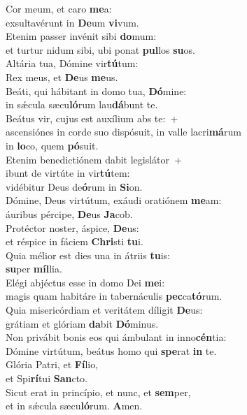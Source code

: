 \evenverse Cor meum, et caro \textbf{me}a:~\*\\
\evenverse exsultavérunt in \textbf{De}um \textbf{vi}vum.\\
\oddverse Etenim passer invénit sibi \textbf{do}mum:~\*\\
\oddverse et turtur nidum sibi, ubi ponat \textbf{pul}los \textbf{su}os.\\
\evenverse Altária tua, Dómine vir\textbf{tú}tum:~\*\\
\evenverse Rex meus, et \textbf{De}us \textbf{me}us.\\
\oddverse Beáti, qui hábitant in domo tua, \textbf{Dó}mine:~\*\\
\oddverse in sǽcula sæcu\textbf{ló}rum lau\textbf{dá}bunt te.\\
\evenverse Beátus vir, cujus est auxílium abs te:~+\\
\evenverse  ascensiónes in corde suo dispósuit, in valle lacri\textbf{má}rum~\*\\
\evenverse in \textbf{lo}co, quem \textbf{pó}suit.\\
\oddverse Etenim benedictiónem dabit legislátor~+\\
\oddverse  ibunt de virtúte in vir\textbf{tú}tem:~\*\\
\oddverse vidébitur Deus de\textbf{ó}rum in \textbf{Si}on.\\
\evenverse Dómine, Deus virtútum, exáudi oratiónem \textbf{me}am:~\*\\
\evenverse áuribus pércipe, \textbf{De}us \textbf{Ja}cob.\\
\oddverse Protéctor noster, áspice, \textbf{De}us:~\*\\
\oddverse et réspice in fáciem \textbf{Chri}sti \textbf{tu}i.\\
\evenverse Quia mélior est dies una in átriis \textbf{tu}is:~\*\\
\evenverse \textbf{su}per \textbf{míl}lia.\\
\oddverse Elégi abjéctus esse in domo Dei \textbf{me}i:~\*\\
\oddverse magis quam habitáre in tabernáculis \textbf{pec}ca\textbf{tó}rum.\\
\evenverse Quia misericórdiam et veritátem díligit \textbf{De}us:~\*\\
\evenverse grátiam et glóriam \textbf{da}bit \textbf{Dó}minus.\\
\oddverse Non privábit bonis eos qui ámbulant in inno\textbf{cén}tia:~\*\\
\oddverse Dómine virtútum, beátus homo qui \textbf{spe}rat \textbf{in} te.\\
\evenverse Glória Patri, et \textbf{Fí}lio,~\*\\
\evenverse et Spi\textbf{rí}tui \textbf{San}cto.\\
\oddverse Sicut erat in princípio, et nunc, et \textbf{sem}per,~\*\\
\oddverse et in sǽcula sæcu\textbf{ló}rum. \textbf{A}men.\\
